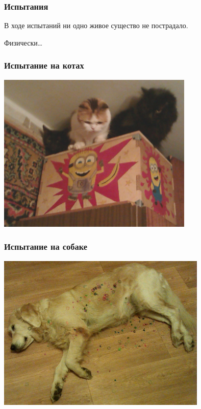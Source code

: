\begin{frame}
    \frametitle{Испытания \myDevice}
    \begin{center}
        В ходе испытаний ни одно живое существо не пострадало.

        Физически\ldots    
    \end{center}    
\end{frame}

\begin{frame}
    \frametitle{Испытание на котах}
    
    \begin{center}
        \includegraphics[width=0.7\textwidth]{fig/cats}
    \end{center}
\end{frame}

\begin{frame}
    \frametitle{Испытание на собаке}
    
    \begin{center}
        \includegraphics[width=0.75\textwidth]{fig/dog}
    \end{center}
\end{frame}

